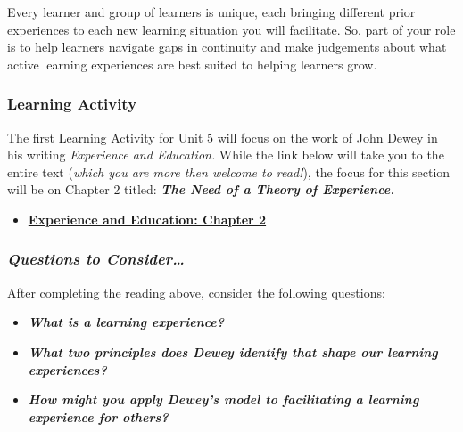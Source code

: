 \documentclass[
]{book}
\providecommand{\tightlist}{%
  \setlength{\itemsep}{0pt}\setlength{\parskip}{0pt}}
\begin{document}
Every learner and group of learners is unique, each bringing different prior experiences to each new learning situation you will facilitate. So, part of your role is to help learners navigate gaps in continuity and make judgements about what active learning experiences are best suited to helping learners grow.

\begin{reflect}
\hypertarget{learning-activity-14}{%
\subsubsection*{Learning Activity}\label{learning-activity-14}}

The first Learning Activity for Unit 5 will focus on the work of John Dewey in his writing \emph{Experience and Education.} While the link below will take you to the entire text (\emph{which you are more then welcome to read!}), the focus for this section will be on Chapter 2 titled: \textbf{\emph{The Need of a Theory of Experience.}}

\begin{itemize}
\tightlist
\item
  \href{http://ruby.fgcu.edu/courses/ndemers/colloquium/experienceducationdewey.pdf}{\textbf{Experience and Education: Chapter 2}}
\end{itemize}

\hypertarget{questions-to-consider}{%
\subsubsection{\texorpdfstring{\textbf{\emph{Questions to Consider\ldots{}}}}{Questions to Consider\ldots{}}}\label{questions-to-consider}}

After completing the reading above, consider the following questions:

\begin{itemize}
\tightlist
\item
  \textbf{\emph{What is a learning experience?}}\\
\item
  \textbf{\emph{What two principles does Dewey identify that shape our learning experiences?}}\\
\item
  \textbf{\emph{How might you apply Dewey's model to facilitating a learning experience for others?}}
\end{itemize}
\end{reflect}
\end{document}
